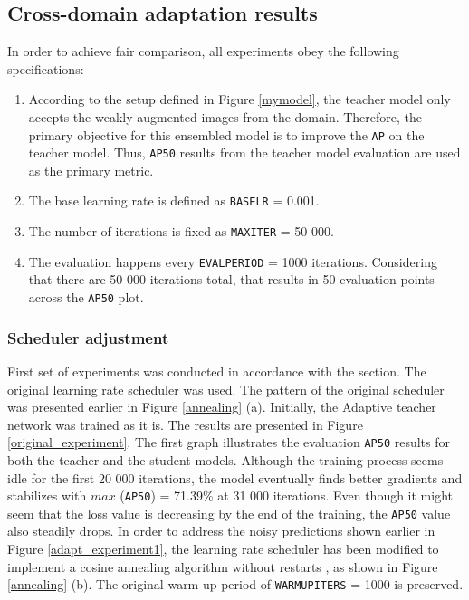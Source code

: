 \documentclass[english, 12pt, a4paper, elec, utf8, a-1b, online]{aaltothesis}
\begin{document}
\subsection{Cross-domain adaptation results}

In order to achieve fair comparison, all experiments obey the following specifications:
\begin{enumerate}
\item According to the setup defined in Figure \ref{mymodel}, the teacher model only accepts the weakly-augmented images from the  domain. Therefore, the primary objective for this ensembled model is to improve the \texttt{AP} on the teacher model. Thus, \texttt{AP50} results from the teacher model evaluation are used as the primary metric. 
\item The base learning rate is defined as \texttt{BASE\textunderscore LR} = 0.001.
\item The number of iterations is fixed as \texttt{MAX\textunderscore ITER} = 50 000.
\item The evaluation happens every \texttt{EVAL\textunderscore PERIOD} = 1000 iterations. Considering that there are 50 000 iterations total, that results in 50 evaluation points across the \texttt{AP50} plot.
\end{enumerate}  
\subsubsection{Scheduler adjustment}
\label{scheduler_section} 
First set of experiments was conducted in accordance with the  section. The original learning rate scheduler was used. The pattern of the original scheduler was presented earlier in Figure \ref{annealing} (a). Initially, the Adaptive teacher network was trained as it is. The results are presented in Figure \ref{original_experiment}. The first graph illustrates the evaluation \texttt{AP50} results for both the teacher and the student models. Although the training process seems idle for the first 20 000 iterations, the model eventually finds better gradients and stabilizes with $max$ (\texttt{AP50}) = 71.39\% at 31 000 iterations. Even though it might seem that the loss value is decreasing by the end of the training, the \texttt{AP50} value also steadily drops. In order to address the noisy predictions shown earlier in Figure \ref{adapt_experiment1}, the learning rate scheduler has been modified to implement a cosine annealing algorithm without restarts \cite{Loshchilov2016}, as shown in Figure \ref{annealing} (b). The original warm-up period of \texttt{WARMUP\textunderscore ITERS} = 1000 is preserved. 
\end{document}
